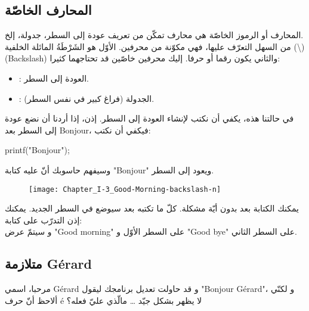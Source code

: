 \subsection{المحارف الخاصّة}

المحارف أو الرموز الخاصّة هي محارف تمكّن من تعريف عودة إلى السطر، جدولة، إلخ.\\
من السهل التعرّف عليها، فهي مكوّنة من محرفين. الأوّل هو الشَرْطَةُ المائلة الخلفية 
(\textbackslash) (\textenglish{Backslash})
والثاني يكون رقما أو حرفا. إليك محرفين خاصّين قد تحتاجهما كثيرا:

\begin{itemize}
  \item {}:
 العودة إلى السطر.
 \item {}:
 الجدولة (فراغ كبير في نفس السطر).
\end{itemize}

في حالتنا هذه، يكفي أن نكتب
 لإنشاء العودة إلى السطر. إذن، إذا أردنا أن نضع عودة إلى السطر بعد
\textenglish{Bonjour}،
فيكفي أن نكتب:

\begin{Csource}
printf("Bonjour\n");
\end{Csource}

وسيفهم حاسوبك أنّ عليه كتابة
"\textenglish{Bonjour}"
 ويعود إلى السطر.

\begin{figure}[H]
	\centering
	\texttt{[image: Chapter\_I-3\_Good-Morning-backslash-n]}
\end{figure}

\begin{information}
  يمكنك الكتابة بعد
بدون أيّة مشكلة. كلّ ما تكتبه بعد
 سيوضع في السطر الجديد. يمكنك إذن التدرّب على كتابة:
\\
و سيتمّ عرض
"\textenglish{Good morning}"
على السطر الأوّل و
"\textenglish{Good bye}"
على السطر الثاني.
\end{information}

\subsection{متلازمة \textenglish{Gérard}}

\begin{question}
  مرحبا، اسمي
\textenglish{Gérard}
و قد حاولت تعديل برنامجك ليقول
"\textenglish{Bonjour Gérard}"،
و لكنّي ألاحظ أنّ حرف
\textenglish{é}
 لا يظهر بشكل جيّد
\dots
 مالّذي عليّ فعله؟
\end{question}

